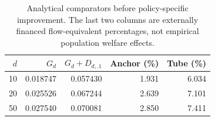 \begin{table}[htbp]\centering\small\setlength{\tabcolsep}{4pt}
\caption{Analytical comparators before policy-specific improvement. The last two columns are externally financed flow-equivalent percentages, not empirical population welfare effects.}\label{tab:r11anchors}
\begin{tabular}{rrrrr}\toprule
$d$ & $G_d$ & $G_d+D_{d,.1}$ & Anchor (\%) & Tube (\%)\\\midrule
10 & 0.018747 & 0.057430 & 1.931 & 6.034 \\
20 & 0.025526 & 0.067244 & 2.639 & 7.101 \\
50 & 0.027540 & 0.070081 & 2.850 & 7.411 \\
\bottomrule\end{tabular}\end{table}
